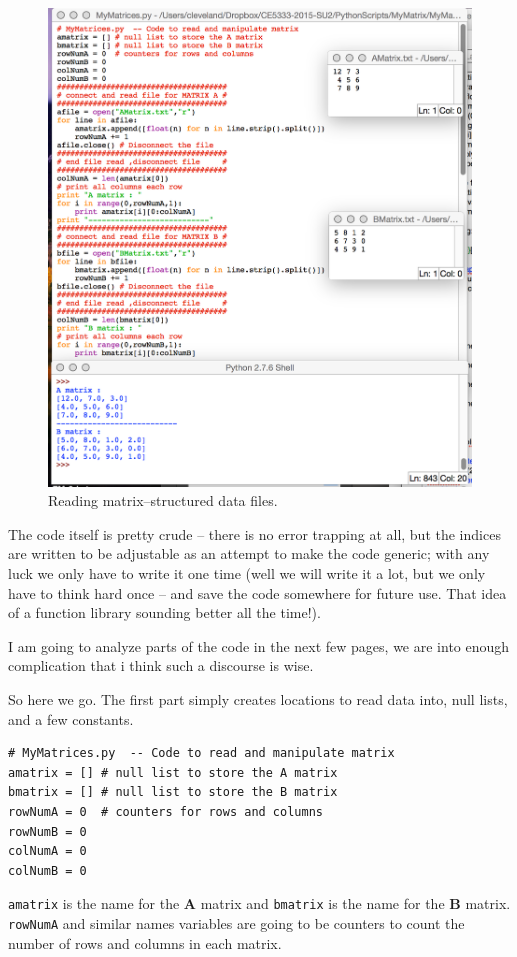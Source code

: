 \begin{figure}[h!] %
   \centering
   \includegraphics[width=6in]{./9-Matrix/ReadMatrixNew.jpg} 
   \caption{Reading matrix--structured data files.}
   \label{fig:ReadMatrixNew}
\end{figure}

The code itself is pretty crude -- there is no error trapping at all, but the indices are written to be adjustable as an attempt to make the code generic; with any luck we only have to write it one time (well we will write it a lot, but we only have to think hard once -- and save the code somewhere for future use.  That idea of a function library sounding better all the time!).

I am going to analyze parts of the code in the next few pages, we are into enough complication that i think such a discourse is wise.  

So here we go.  
The first part simply creates locations to read data into, null lists, and a few constants.
\begin{verbatim}
# MyMatrices.py  -- Code to read and manipulate matrix
amatrix = [] # null list to store the A matrix
bmatrix = [] # null list to store the B matrix
rowNumA = 0  # counters for rows and columns
rowNumB = 0
colNumA = 0
colNumB = 0
\end{verbatim}
\texttt{amatrix} is the name for the $\mathbf{A}$ matrix and \texttt{bmatrix} is the name for the $\mathbf{B}$ matrix.
\texttt{rowNumA} and similar names variables are going to be counters to count the number of rows and columns in each matrix.

